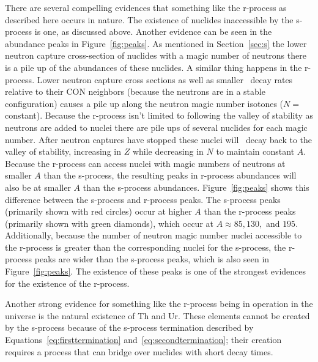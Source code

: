 { There are several compelling evidences that something like the
 r-process as described here occurs in nature.  The existence of
 nuclides inaccessible by the s-process is one, as discussed above.  
Another evidence  can be seen in
the abundance peaks in Figure~\ref{fig:peaks}.  As
mentioned in Section~\ref{sec:s} 
the lower neutron capture cross-section of nuclides with a magic
number of neutrons there is a pile up of the abundances of these
nuclides.   A similar thing happens in the r-process.  Lower neutron
 capture cross sections as well as smaller \bminus\ decay rates
 relative to their CON neighbors
 (because the neutrons are in a stable configuration) causes a pile up
 along the neutron magic number isotones ($N=$ constant). Because the r-process isn't limited to
 following the valley of stability as neutrons are added to nuclei
 there are pile ups of several nuclides for each magic number.  After
 neutron captures have stopped these nuclei will \bminus\ decay back
 to the valley of stability, increasing in $Z$ while decreasing in $N$
 to maintain constant $A$.  Because the r-process can access nuclei with magic
 numbers of neutrons at smaller $A$ than the s-process, the resulting
 peaks in r-process abundances will also be at smaller $A$ than the
 s-process abundances. Figure~\ref{fig:peaks} shows this difference
 between the s-process and r-process peaks.  The s-process peaks
 (primarily shown with red circles)  occur at
 higher $A$ than the r-process peaks (primarily shown with green
 diamonds), which occur at $A\approx 85, 130, $ and $195$.  
Additionally, because the number of neutron magic
number nuclei accessible to the r-process is greater than the
corresponding nuclei for the s-process, the r-process peaks are wider
than the s-process peaks, which is also seen in
 Figure~\ref{fig:peaks}.  
The existence of these peaks is one of the
strongest evidences for the existence of the r-process.


Another strong evidence for something like the r-process being in
operation in the universe is the natural existence of Th and Ur.
These elements cannot be created by the s-process because of the
s-process termination described by Equations~\ref{eq:firsttermination}
and~\ref{eq:secondtermination}; their creation requires a process that
can bridge over nuclides with short decay times.






}
